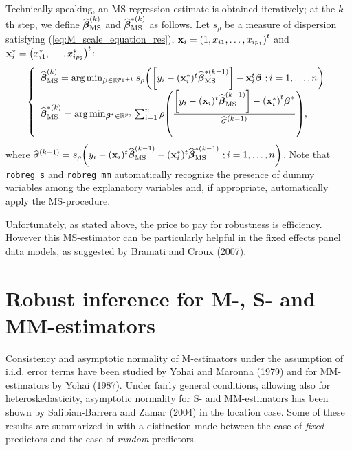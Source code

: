 Technically speaking, an MS-regression estimate is obtained iteratively; at
the $k$-th step, we define $\widehat{\boldsymbol\beta}_{\mathrm{MS}}^{(k)}$
and $\widehat{\boldsymbol\beta}_{\mathrm{MS}}^{\ast(k)}$ as follows. Let
$s_{\rho}$ be a measure of dispersion satisfying
(\ref{eq:M_scale_equation_res}), $\stvec{x}_{i}=\left(  1,x_{i1}%
,\ldots,x_{ip_{1}}\right)  ^{t}$ and $\stvec{x}_{i}^{\ast}=\left(
x_{i1}^{\ast},\ldots,x_{ip_{2}}^{\ast}\right)  ^{t}$:
\[
\left\{
\begin{array}
[c]{l}%
\sthat{\boldsymbol\beta}_{\mathrm{MS}}^{(k)}=\arg\min_{\boldsymbol{\beta
}\in%
\mathbb{R}
^{p_{1}+1}}s_{\rho}\left(  \left[  y_{i}-(\stvec{x}_{i}^{\ast})^{t}%
\sthat{\boldsymbol\beta}_{\mathrm{MS}}^{\ast(k-1)}\right]  -\stvec{x}%
_{i}^{t}\boldsymbol{\beta\ };i = 1, \dots, n\right) \\
\sthat{\boldsymbol\beta}_{\mathrm{MS}}^{\ast(k)}=\arg\min
_{\boldsymbol\beta^{\ast}\in%
\mathbb{R}
^{p_{2}}}\sum_{i=1}^{n}\rho\left(  \dfrac{\left[  y_{i}-(\stvec{x}_{i}%
)^{t}\sthat{\boldsymbol\beta}_{\mathrm{MS}}^{(k-1)}\right]  -\left(
\stvec{x}_{i}^{\ast}\right)  ^{t}\boldsymbol\beta^{\ast}}{\sthat{\sigma
}^{(k-1)}}\right)  ,
\end{array}
\right.
\]
where $\sthat{\sigma}^{(k-1)}=s_{\rho}\left(  y_{i}-(\stvec{x}_{i}%
)^{t}\sthat{\boldsymbol\beta}_{\mathrm{MS}}^{(k-1)}-(\stvec{x}_{i}^{\ast
})^{t}\sthat{\boldsymbol\beta}_{\mathrm{MS}}^{\ast(k-1)}\boldsymbol{\ }%
;i = 1, \dots, n\right)  $. Note that \texttt{robreg s} and \texttt{robreg mm}
automatically recognize the presence of dummy variables among the explanatory
variables and, if appropriate, automatically apply the MS-procedure.

Unfortunately, as stated above, the price to pay for robustness is efficiency.
However this MS-estimator can be particularly helpful in the fixed effects
panel data models, as suggested by Bramati and Croux (2007).

\section{Robust inference for M-, S- and MM-estimators}
\label{sec:inference}

Consistency and asymptotic normality of M-estimators under the assumption of
i.i.d. error terms have been studied by Yohai and Maronna (1979) and for
MM-estimators by Yohai (1987). Under fairly general conditions, allowing also
for heteroskedasticity, asymptotic normality for S- and MM-estimators has been
shown by Salibian-Barrera and Zamar (2004) in the location case. Some of these
results are summarized in \citet{maronna:etal:2006} with a
distinction made between the case of \emph{fixed} predictors and the case of
\emph{random} predictors.

